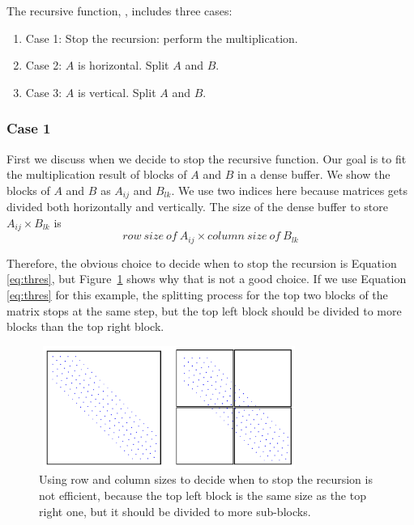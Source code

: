 The recursive function, \recmm, includes three cases:
\begin{enumerate}
 \item Case 1: Stop the recursion: perform the multiplication.
 \item Case 2: $A$ is horizontal. Split $A$ and $B$.
 \item Case 3: $A$ is vertical. Split $A$ and $B$.
\end{enumerate}

\subsubsection{Case 1}
\label{sec:case1}
First we discuss when we decide to stop the recursive function.  
Our goal is to fit the multiplication result of blocks of $A$ and $B$ in a dense buffer. We show the blocks of $A$ and $B$ as $A_{ij}$ and $B_{lk}$. We use two indices here because matrices gets divided both horizontally and vertically. The size of the dense buffer to store $A_{ij} \times B_{lk}$ is
\begin{equation}
    row\ size\ of\ A_{ij} \times column\ size\ of\ B_{lk}\label{eq:thres}
\end{equation}

Therefore, the obvious choice to decide when to stop the recursion is Equation~ \eqref{eq:thres}, but Figure~\ref{fig:thres} shows why that is not a good choice. If we use Equation~ \eqref{eq:thres} for this example, the splitting process for the top two blocks of the matrix stops at the same step, but the top left block should be divided to more blocks than the top right block.

\begin{figure}[tbh]
 \centering
 \includegraphics[width=8.5cm,height=4cm]{./figures/split3.pdf}
 \caption{Using row and column sizes to decide when to stop the recursion is not efficient, because the top left block is the same size as the top right one, but it should be divided to more sub-blocks.}
 \label{fig:thres}
 \Description{}
\end{figure}

